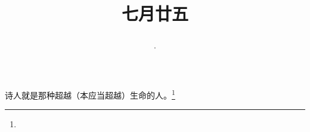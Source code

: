 \title{\date[d=28,m=8,y=2024][year:cn-y,年,month:cn,day:cn,日,·,weekday]·七月廿五 }
诗人就是那种超越（本应当超越）生命的人。\footnote{ }

